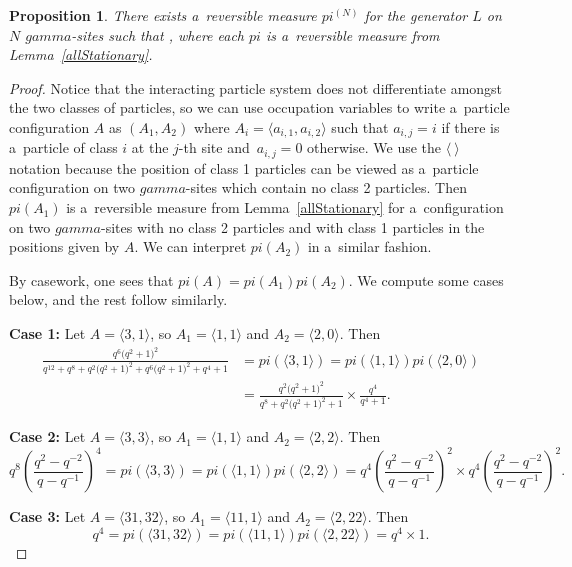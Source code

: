 \documentclass[10pt,a4paper]{amsart}
\numberwithin{equation}{section}
\newtheorem{Proposition}[Theorem]{Proposition}
\theoremstyle{definition}
\def\pi{pi}
\def\gamma{gamma}
\begin{document}
\begin{Proposition}
\label{generalizeStationary}
There exists a~reversible measure $\pi^{(N)}$ for the generator $L$ on $N$ $\gamma$-sites such that \smash{$\pi^{(N)}(\langle a_1, \dots, a_N \rangle) = \prod_{i < j} \pi(\langle a_i, a_j \rangle)$},
where each $\pi$ is a~reversible measure from Lemma~{\rm\ref{allStationary}}.
\end{Proposition}

\begin{proof}\label{generalizeStationaryProof}
Notice that the interacting particle system does not differentiate amongst the two classes of particles, so we can use occupation variables to write a~particle configuration $A$ as $(A_1, A_2)$ where $A_i= \langle a_{i,1}, a_{i,2} \rangle$ such that $a_{i,j} = i$ if there is a~particle of class $i$ at the $j$-th site and~${a_{i,j}=0}$ otherwise. We use the $\langle ~\rangle$ notation because the position of class 1 particles can be viewed as a~particle configuration on two $\gamma$-sites which contain no class 2 particles. Then $\pi(A_1)$ is a~reversible measure from Lemma~\ref{allStationary} for a~configuration on two $\gamma$-sites with no class 2 particles and with class 1 particles in the positions given by $A$. We can interpret $\pi(A_2)$ in a~similar fashion.

By casework, one sees that $\pi(A) = \pi(A_1)\pi(A_2)$. We compute some cases below, and the rest follow similarly.

\textbf{Case 1:} Let $A = \langle 3,1 \rangle$, so $A_1 = \langle 1,1 \rangle$ and $A_2 = \langle 2,0 \rangle$. Then
\begin{align*}
 \frac{ q^6\bigl(q^2+1\bigr)^2}{q^{12} + q^8 + q^2\bigl(q^2+1\bigr)^2+q^6\bigl(q^2+1\bigr)^2+ q^4 +1} &= \pi(\langle 3,1 \rangle)= \pi(\langle 1,1 \rangle) \pi(\langle 2,0 \rangle) \\
 &= \frac{q^2\bigl(q^2+1\bigr)^2}{q^8 + q^2\bigl(q^2+1\bigr)^2 + 1} \times \frac{q^4}{q^4 + 1}.
\end{align*}

\textbf{Case 2:} Let $A = \langle 3,3 \rangle$, so $A_1 = \langle 1,1 \rangle$ and $A_2 = \langle 2,2\rangle$. Then
\[q^8 \left(\frac{q^2 - q^{-2}}{q-q^{-1}} \right)^4 = \pi(\langle 3,3 \rangle) = \pi(\langle 1,1 \rangle) \pi(\langle 2,2\rangle) = q^4\left(\frac{q^2 - q^{-2}}{q-q^{-1}} \right)^2 \times q^4\left(\frac{q^2 - q^{-2}}{q-q^{-1}} \right)^2.\]

\textbf{Case 3:} Let $A = \langle 31,32\rangle$, so $A_1 = \langle 11,1\rangle$ and $A_2 = \langle 2,22\rangle$. Then
\[q^4 = \pi(\langle 31,32\rangle) = \pi(\langle 11,1\rangle) \pi(\langle 2,22\rangle) = q^4 \times 1.\]


\end{proof}
\end{document}
